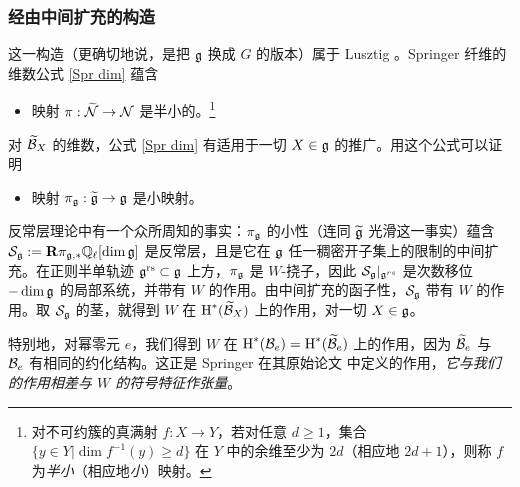 \subsubsection{经由中间扩充的构造}\label{sss:mid} 这一构造（更确切地说，是把 $\mathfrak{g}$ 换成 $G$ 的版本）属于 Lusztig \cite[\S3]{LuGreen}。Springer 纤维的维数公式 \eqref{Spr dim} 蕴含
\begin{itemize}
\item 映射 $\pi:\widetilde{\mathcal{N}}\to\mathcal{N}$ 是半小的。\footnote{对不可约簇的真满射 $f:X\to Y$，若对任意 $d\geq 1$，集合 $\{y\in Y|\dim f^{-1}(y)\geq d\}$ 在 $Y$ 中的余维至少为 $2d$（相应地 $2d+1$），则称 $f$ 为{\em 半小}（相应地{\em 小}）映射。}
\end{itemize}
对 $\widetilde{\mathcal{B}}_{X}$ 的维数，公式 \eqref{Spr dim} 有适用于一切 $X\in \mathfrak{g}$ 的推广。用这个公式可以证明
\begin{itemize}
\item 映射 $\pi_{\mathfrak{g}}:\widetilde{\mathfrak{g}}\to\mathfrak{g}$ 是小映射。
\end{itemize}
反常层理论中有一个众所周知的事实：$\pi_{\mathfrak{g}}$ 的小性（连同 $\widetilde{\mathfrak{g}}$ 光滑这一事实）蕴含 $\mathcal{S}_{\mathfrak{g}}:=\mathbf{R}\pi_{\mathfrak{g},*}\mathbb{Q}_{\ell}[\dim\mathfrak{g}]$ 是反常层，且是它在 $\mathfrak{g}$ 任一稠密开子集上的限制的中间扩充。在正则半单轨迹 $\mathfrak{g}^{\textup{rs}}\subset \mathfrak{g}$ 上方，$\pi_{\mathfrak{g}}$ 是 $W$-挠子，因此 $\mathcal{S}_{\mathfrak{g}}|_{\mathfrak{g}^{rs}}$ 是次数移位 $-\dim\mathfrak{g}$ 的局部系统，并带有 $W$ 的作用。由中间扩充的函子性，$\mathcal{S}_{\mathfrak{g}}$ 带有 $W$ 的作用。取 $\mathcal{S}_{\mathfrak{g}}$ 的茎，就得到 $W$ 在 $\textup{H}^{*}({\widetilde{\mathcal{B}}_{X}})$ 上的作用，对一切 $X\in\mathfrak{g}$。

特别地，对幂零元 $e$，我们得到 $W$ 在 $\textup{H}^{*}({\mathcal{B}_{e}})=\textup{H}^{*}({\widetilde{\mathcal{B}}_{e}})$ 上的作用，因为 $\widetilde{\mathcal{B}}_{e}$ 与 $\mathcal{B}_{e}$ 有相同的约化结构。这正是 Springer 在其原始论文 \cite{Springer} 中定义的作用，{\em 它与我们的作用相差与 $W$ 的符号特征作张量}。
